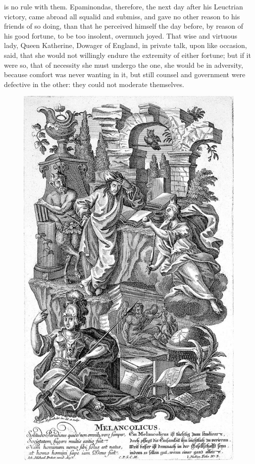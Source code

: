{is no rule with them. Epaminondas, therefore, the next day after his
Leuctrian victory, came abroad all squalid and submiss, and gave
no other reason to his friends of so doing, than that he perceived
himself the day before, by reason of his good fortune, to be too
insolent, overmuch joyed. That wise and virtuous lady, Queen
Katherine, Dowager of England, in private talk, upon like occasion,
said, that she would not willingly endure the extremity of either
fortune; but if it were so, that of necessity she must undergo the one,
she would be in adversity, because comfort was never wanting in it, but
still counsel and government were defective in the other: they could
not moderate themselves.

\begin{figure}[p]
  \centering
  \includegraphics[keepaspectratio,width=\textwidth]{figures/scholar-small.jpg}
  \caption{}
  \label{fig:scholar}
\end{figure}

}

